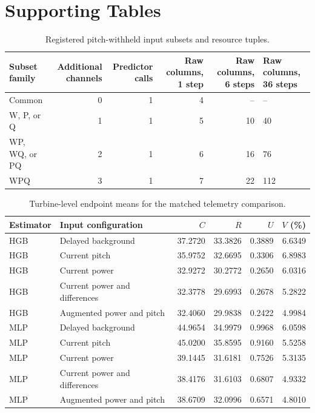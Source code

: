 \section*{Supporting Tables}

\begin{table}[H]
\caption{Registered pitch-withheld input subsets and resource tuples.}
\label{tab:subsets}
\centering
\scriptsize
\begin{tabular}{lrrrrl}
\toprule
Subset family & Additional channels & Predictor calls & Raw columns, 1 step & Raw columns, 6 steps & Raw columns, 36 steps \\
\midrule
Common & 0 & 1 & 4 & -- & -- \\
W, P, or Q & 1 & 1 & 5 & 10 & 40 \\
WP, WQ, or PQ & 2 & 1 & 6 & 16 & 76 \\
WPQ & 3 & 1 & 7 & 22 & 112 \\
\bottomrule
\end{tabular}
\end{table}

\begin{table}[H]
\caption{Turbine-level endpoint means for the matched telemetry comparison.}
\label{tab:wtb-full}
\centering
\scriptsize
\begin{tabular}{llrrrr}
\toprule
Estimator & Input configuration & $C$ & $R$ & $U$ & $V$ (\%) \\
\midrule
HGB & Delayed background & 37.2720 & 33.3826 & 0.3889 & 6.6349 \\
HGB & Current pitch & 35.9752 & 32.6695 & 0.3306 & 6.8983 \\
HGB & Current power & 32.9272 & 30.2772 & 0.2650 & 6.0316 \\
HGB & Current power and differences & 32.3778 & 29.6993 & 0.2678 & 5.2822 \\
HGB & Augmented power and pitch & 32.4060 & 29.9838 & 0.2422 & 4.9984 \\
MLP & Delayed background & 44.9654 & 34.9979 & 0.9968 & 6.0598 \\
MLP & Current pitch & 45.0200 & 35.8595 & 0.9160 & 5.5258 \\
MLP & Current power & 39.1445 & 31.6181 & 0.7526 & 5.3135 \\
MLP & Current power and differences & 38.4176 & 31.6103 & 0.6807 & 4.9332 \\
MLP & Augmented power and pitch & 38.6709 & 32.0996 & 0.6571 & 4.8010 \\
\bottomrule
\end{tabular}
\end{table}

